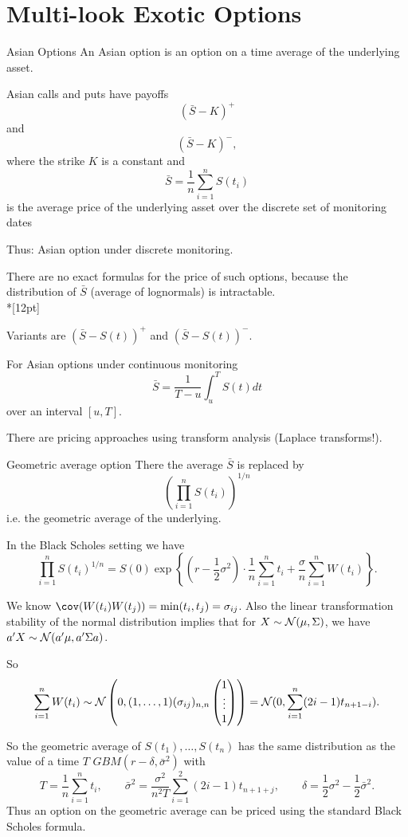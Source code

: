 \section{Multi-look Exotic Options}
Asian Options
	An Asian option is an option on a time average of the underlying
	asset.

	Asian calls and puts have payoffs
		$$(\bar{S}-K)^+$$
		and
		$$(\bar{S}-K)^-,$$
	where the strike $K$ is a constant and
		$$
		\bar{S}=\frac{1}{n}\sum_{i=1}^n S(t_i)
		$$ 
	is the average price of the underlying asset over the discrete set of monitoring dates

	Thus: Asian option under discrete monitoring.

	There are no exact formulas for the price of such options, because
	the distribution of $\bar{S}$ (average of lognormals) is
	intractable.\\*[12pt]

	Variants are $(\bar{S}-S(t))^+$ and $(\bar{S}-S(t))^-$.

	For Asian options under continuous monitoring
		$$
		\bar{S}=\frac{1}{T-u}\int_u^T S(t)dt
		$$
	over an interval $[u,T]$.

	There are pricing approaches using transform analysis (Laplace transforms!).


Geometric average option
	There the average $\bar{S}$ is replaced by
		$$
		\left(\prod_{i=1}^n S(t_i)\right)^{1/n}
		$$
	i.e. the geometric average of the underlying.

	In the Black Scholes setting we have
	$$
	\prod_{i=1}^nS(t_i)^{1/n}=
	S(0)\exp\left\{\left(r-\frac{1}{2}\sigma^2\right)\cdot\frac{1}{n}\sum_{i=1}^n t_i+
	\frac{\sigma}{n}\sum_{i=1}^n W(t_i)\right\}.
	$$

	We know $\cov(W(t_i)W(t_j))=\min(t_i,t_j)=\sigma_{ij}$.
	Also the linear transformation stability of the normal
	distribution implies that for $X\sim{\cal N}(\mu,\Sigma)$, we have
	$a'X\sim{\cal N}(a'\mu,a'\Sigma a)$.

	So
		$$
		\sum_{i=1}^nW(t_i)\sim{\cal N}\left(0,(1,\ldots,1)(\sigma_{ij})_{n,n}
		\begin{pmatrix} 1 \\ \vdots \\ 1 \end{pmatrix}\right)
		={\cal N}(0,\sum_{i=1}^n(2i-1)t_{n+1-i}).
		$$

	So the geometric average of $S(t_1),\ldots,S(t_n)$ has the
	same distribution as the value of a time $T$
	$GBM(r-\delta,\bar{\sigma}^{2})$ with
		$$
		T=\frac{1}{n}\sum_{i=1}^nt_i,\qquad\bar{\sigma}^2=\frac{\sigma^2}{n^2T}\sum_{i=1}^2(2i-1)t_{n+1+j},
		\qquad\delta=\frac{1}{2}\sigma^2-\frac{1}{2}\bar{\sigma}^2.
		$$
	Thus an option on the geometric average can be priced using the
	standard Black Scholes formula.


